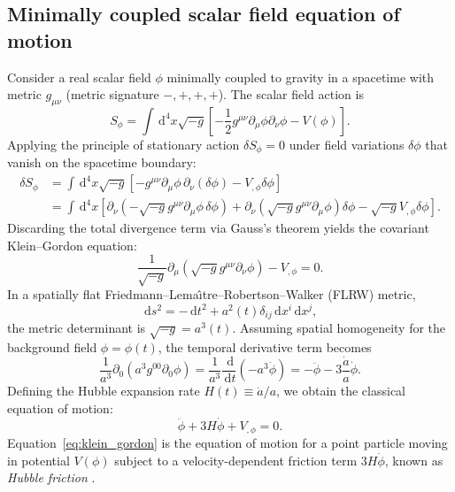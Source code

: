 \documentclass[11pt]{article}
\newcommand{\dd}{\,\mathrm d}
\begin{document}
\subsection{Minimally coupled scalar field equation of motion}
Consider a real scalar field $\phi$ minimally coupled to gravity in a spacetime with metric $g_{\mu\nu}$ (metric signature $-,+,+,+$). The scalar field action is
\begin{equation}
S_\phi = \int \dd^4x \sqrt{-g} \left[ -\frac{1}{2}g^{\mu\nu}\partial_\mu\phi\partial_\nu\phi - V(\phi) \right].
\label{eq:scalar_action}
\end{equation}
Applying the principle of stationary action $\delta S_\phi = 0$ under field variations $\delta\phi$ that vanish on the spacetime boundary:
\begin{align}
\delta S_\phi &= \int \dd^4x \sqrt{-g} \left[ -g^{\mu\nu}\partial_\mu\phi\,\partial_\nu(\delta\phi) - V_{,\phi}\delta\phi \right] \nonumber\\
&= \int \dd^4x \left[ \partial_\nu\left( -\sqrt{-g}g^{\mu\nu}\partial_\mu\phi\,\delta\phi \right) + \partial_\nu\left(\sqrt{-g}g^{\mu\nu}\partial_\mu\phi\right)\delta\phi - \sqrt{-g}V_{,\phi}\delta\phi \right].
\end{align}
Discarding the total divergence term via Gauss's theorem yields the covariant Klein--Gordon equation:
\begin{equation}
\frac{1}{\sqrt{-g}}\partial_\mu\left(\sqrt{-g}g^{\mu\nu}\partial_\nu\phi\right) - V_{,\phi} = 0.
\end{equation}
In a spatially flat Friedmann--Lema\^{\i}tre--Robertson--Walker (FLRW) metric,
\begin{equation}
\dd s^2 = -\dd t^2 + a^2(t)\delta_{ij}\dd x^i\dd x^j,
\end{equation}
the metric determinant is $\sqrt{-g} = a^3(t)$. Assuming spatial homogeneity for the background field $\phi = \phi(t)$, the temporal derivative term becomes
\begin{equation}
\frac{1}{a^3}\partial_0\left(a^3 g^{00}\partial_0\phi\right) = \frac{1}{a^3}\frac{\dd}{\dd t}\left(-a^3\dot\phi\right) = -\ddot\phi - 3\frac{\dot a}{a}\dot\phi.
\end{equation}
Defining the Hubble expansion rate $H(t) \equiv \dot a / a$, we obtain the classical equation of motion:
\begin{equation}
\boxed{\ddot\phi + 3H\dot\phi + V_{,\phi} = 0}.
\label{eq:klein_gordon}
\end{equation}
Equation~\eqref{eq:klein_gordon} is the equation of motion for a point particle moving in potential $V(\phi)$ subject to a velocity-dependent friction term $3H\dot\phi$, known as \emph{Hubble friction} \cite{turner1983scalar,smith2020oscillating}.
\end{document}
